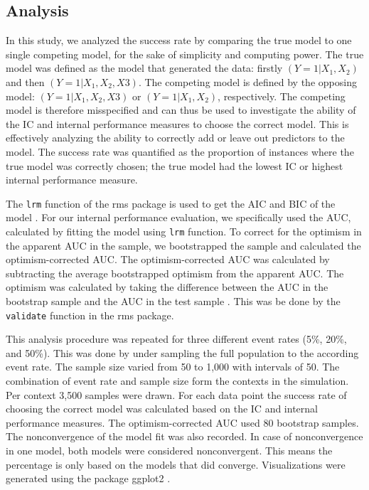 \documentclass[AMA,STIX1COL]{WileyNJD-v5}
\begin{document}
\hypertarget{analysis}{%
\subsection{Analysis}\label{analysis}}

In this study, we analyzed the success rate by comparing the true model
to one single competing model, for the sake of simplicity and computing
power. The true model was defined as the model that generated the data:
firstly \((Y=1|X_1, X_2)\) and then \((Y=1|X_1, X_2, X3)\). The
competing model is defined by the opposing model: \((Y=1|X_1, X_2, X3)\)
or \((Y=1|X_1, X_2)\), respectively. The competing model is therefore
misspecified and can thus be used to investigate the ability of the IC
and internal performance measures to choose the correct model. This is
effectively analyzing the ability to correctly add or leave out
predictors to the model. The success rate was quantified as the
proportion of instances where the true model was correctly chosen; the
true model had the lowest IC or highest internal performance measure.

The \texttt{lrm} function of the rms package is used to get the AIC and
BIC of the model \citep{harrellRegressionModelingStrategies2015}. For
our internal performance evaluation, we specifically used the AUC,
calculated by fitting the model using \texttt{lrm} function. To correct
for the optimism in the apparent AUC in the sample, we bootstrapped the
sample and calculated the optimism-corrected AUC. The optimism-corrected
AUC was calculated by subtracting the average bootstrapped optimism from
the apparent AUC. The optimism was calculated by taking the difference
between the AUC in the bootstrap sample and the AUC in the test sample
\citep{steyerbergInternalValidationPredictive2001}. This was be done by
the \texttt{validate} function in the rms package.

This analysis procedure was repeated for three different event rates
(5\%, 20\%, and 50\%). This was done by under sampling the full
population to the according event rate. The sample size varied from 50
to 1,000 with intervals of 50. The combination of event rate and sample
size form the contexts in the simulation. Per context 3,500 samples were
drawn. For each data point the success rate of choosing the correct
model was calculated based on the IC and internal performance measures.
The optimism-corrected AUC used 80 bootstrap samples. The nonconvergence
of the model fit was also recorded. In case of nonconvergence in one
model, both models were considered nonconvergent. This means the
percentage is only based on the models that did converge. Visualizations
were generated using the package ggplot2
\citep{wickhamGettingStartedGgplot22016}.
\end{document}
